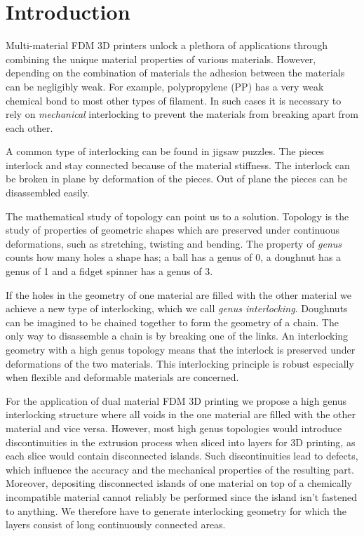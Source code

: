 \section{Introduction}
Multi-material FDM 3D printers unlock a plethora of applications through combining the unique material properties of various materials.
However, depending on the combination of materials the adhesion between the materials can be negligibly weak.
For example, polypropylene (PP) has a very weak chemical bond to most other types of filament.
In such cases it is necessary to rely on \emph{mechanical} interlocking to prevent the materials from breaking apart from each other.

A common type of interlocking can be found in jigsaw puzzles.
The pieces interlock and stay connected because of the material stiffness.
The interlock can be broken in plane by deformation of the pieces.
Out of plane the pieces can be disassembled easily.

The mathematical study of topology can point us to a solution.
Topology is the study of properties of geometric shapes which are preserved under continuous deformations, such as stretching, twisting and bending.
The property of \emph{genus} counts how many holes a shape has;
a ball has a genus of 0, a doughnut has a genus of 1 and a fidget spinner has a genus of 3.

If the holes in the geometry of one material are filled with the other material we achieve a new type of interlocking, which we call \emph{genus interlocking}.
Doughnuts can be imagined to be chained together to form the geometry of a chain.
The only way to disassemble a chain is by breaking one of the links.
An interlocking geometry with a high genus topology means that the interlock is preserved under deformations of the two materials.
This interlocking principle is robust especially when flexible and deformable materials are concerned.

For the application of dual material FDM 3D printing we propose a high genus interlocking structure where all voids in the one material are filled with the other material and vice versa.
However, most high genus topologies would introduce discontinuities in the extrusion process when sliced into layers for 3D printing, as each slice would contain disconnected islands.
Such discontinuities lead to defects, which influence the accuracy and the mechanical properties of the resulting part.
Moreover, depositing disconnected islands of one material on top of a chemically incompatible material cannot reliably be performed since the island isn't fastened to anything.
We therefore have to generate interlocking geometry for which the layers consist of long continuously connected areas.

